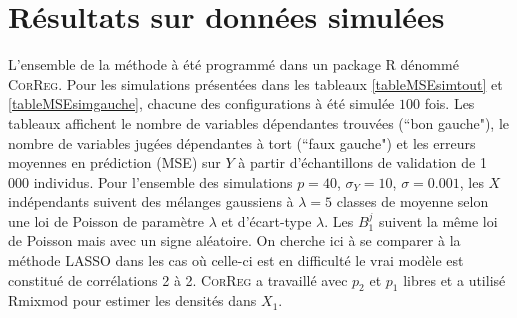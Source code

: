 \documentclass[12pt]{article}
\begin{document}
\section{Résultats sur données simulées}\label{secressim}	
L'ensemble de la méthode à été programmé dans un package R dénommé \textsc{CorReg}. Pour les simulations présentées dans les tableaux %
 \ref{tableMSEsimtout} et \ref{tableMSEsimgauche}, chacune des configurations à été simulée $100$ fois. Les tableaux affichent le nombre de variables dépendantes trouvées (``bon gauche"), le nombre de variables jugées dépendantes à tort (``faux gauche") et les erreurs moyennes en prédiction (MSE) sur $Y$ à partir d'échantillons de validation de 1 000 individus. Pour l'ensemble des simulations $p=40$, $\sigma_Y=10$, $\sigma=0.001$, les $X$ indépendants suivent des mélanges gaussiens à $\lambda=5$ classes de moyenne selon une loi de Poisson de paramètre $\lambda$ et d'écart-type $\lambda$. Les $B_{1}^j$ suivent la même loi de Poisson mais avec un signe aléatoire. On cherche ici à se comparer à la méthode LASSO dans les cas où celle-ci est en difficulté le vrai modèle est constitué de corrélations 2 à 2. \textsc{CorReg}  a  travaillé avec $p_2$ et $p_1$ libres et a utilisé Rmixmod pour estimer les densités dans $X_1$. 
%
\end{document}
